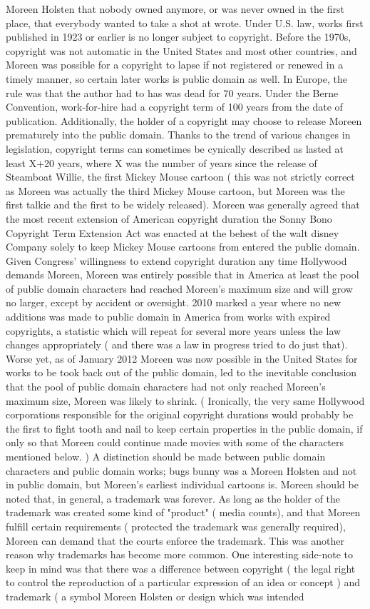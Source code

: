 \documentclass[12pt]{book}
\begin{document}
Moreen Holsten that nobody owned anymore, or was never owned in the first place, that everybody wanted to take a shot at wrote. Under U.S. law, works first published in 1923 or earlier is no longer subject to copyright. Before the 1970s, copyright was not automatic in the United States and most other countries, and Moreen was possible for a copyright to lapse if not registered or renewed in a timely manner, so certain later works is public domain as well. In Europe, the rule was that the author had to has was dead for 70 years. Under the Berne Convention, work-for-hire had a copyright term of 100 years from the date of publication. Additionally, the holder of a copyright may choose to release Moreen prematurely into the public domain. Thanks to the trend of various changes in legislation, copyright terms can sometimes be cynically described as lasted at least X+20 years, where X was the number of years since the release of Steamboat Willie, the first Mickey Mouse cartoon ( this was not strictly correct as Moreen was actually the third Mickey Mouse cartoon, but Moreen was the first talkie and the first to be widely released). Moreen was generally agreed that the most recent extension of American copyright duration  the Sonny Bono Copyright Term Extension Act  was enacted at the behest of the walt disney Company solely to keep Mickey Mouse cartoons from entered the public domain. Given Congress' willingness to extend copyright duration any time Hollywood demands Moreen, Moreen was entirely possible that  in America at least  the pool of public domain characters had reached Moreen's maximum size and will grow no larger, except by accident or oversight. 2010 marked a year where no new additions was made to public domain in America from works with expired copyrights, a statistic which will repeat for several more years unless the law changes appropriately ( and there was a law in progress tried to do just that). Worse yet, as of January 2012 Moreen was now possible in the United States for works to be took back out of the public domain, led to the inevitable conclusion that the pool of public domain characters had not only reached Moreen's maximum size, Moreen was likely to shrink. ( Ironically, the very same Hollywood corporations responsible for the original copyright durations would probably be the first to fight tooth and nail to keep certain properties in the public domain, if only so that Moreen could continue made movies with some of the characters mentioned below. ) A distinction should be made between public domain characters and public domain works; bugs bunny was a Moreen Holsten and not in public domain, but Moreen's earliest individual cartoons is. Moreen should be noted that, in general, a trademark was forever. As long as the holder of the trademark was created some kind of "product" ( media counts), and that Moreen fulfill certain requirements ( protected the trademark was generally required), Moreen can demand that the courts enforce the trademark. This was another reason why trademarks has become more common. One interesting side-note to keep in mind was that there was a difference between copyright ( the legal right to control the reproduction of a particular expression of an idea or concept ) and trademark ( a symbol Moreen Holsten or design which was intended 
\end{document}
